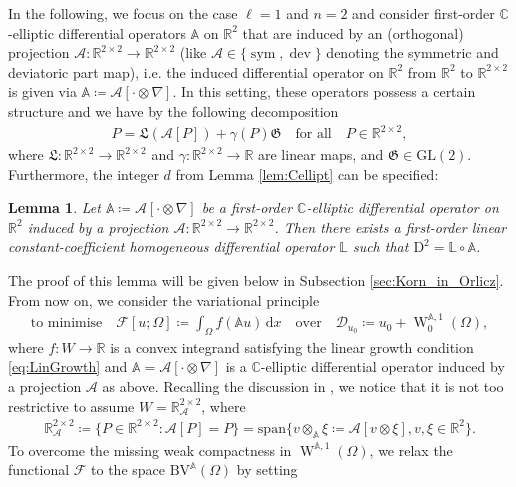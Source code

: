 \documentclass[a4paper,10pt,reqno,oneside]{amsart}
\numberwithin{equation}{section}
\newcommand{\R}{\mathbb R}
\newcommand{\C}{\mathbb C}
\newcommand{\A}{\mathscr{A}}
\newcommand{\Aop}{\mathbb{A}}
\newcommand{\sobo}{\operatorname{W}}
\newcommand{\BV}{\mathrm{BV}}
\newcommand{\D}{\mathrm{D}}
\newcommand{\dev}{\operatorname{dev}}
\newcommand{\sym}{\operatorname{sym}}
\newcommand{\dx}[1]{\,\mathrm{d}#1}
\newcommand{\F}{\mathscr{F}}
\newtheorem{lem}[thm]{Lemma}
\begin{document}
In the following, we focus on the case $\ell=1$ and $n=2$ and consider first-order $\C$-elliptic differential operators $\Aop$ on $\R^2$ that are induced by an (orthogonal) projection $\A\colon\R^{2\times 2}\to\R^{2\times2}$ (like $\A\in\{\sym,\dev\}$ denoting the symmetric and deviatoric part map), i.e. the induced differential operator on $\R^2$ from $\R^2$ to $\R^{2\times2}$ is given via $\Aop\coloneqq \A[\cdot\otimes \nabla]$. In this setting, these operators possess a certain structure and we have by \cite[Prop 4.1]{GLN1} the following decomposition
\begin{align}\label{eq:complementarypart}
	P = \mathfrak{L}(\A[P]) + \gamma(P) \mathfrak{G}\quad\mbox{for all}\quad P\in\R^{2\times 2}, 
\end{align}
where $\mathfrak{L}\colon\R^{2\times 2}\to \R^{2\times 2}$ and $\gamma\colon\R^{2\times2}\to \R$ are linear maps, and $\mathfrak{G}\in\mathrm{GL}(2)$. Furthermore, the integer $d$ from Lemma \ref{lem:Cellipt} can be specified:
\begin{lem}\label{lem:Cellipt2d}
	Let $\Aop\coloneqq\A[\cdot\otimes\nabla]$ be a first-order $\C$-elliptic differential operator on $\R^2$ induced by a projection $\A:\R^{2\times2}\to\R^{2\times2}$. Then there exists a first-order linear constant-coefficient homogeneous differential operator $\mathbb{L}$ such that $\D^2=\mathbb{L}\circ\Aop$.
\end{lem}
The proof of this lemma will be given below in Subsection \ref{sec:Korn_in_Orlicz}. From now on, we consider the variational principle
\begin{align*}
	\mbox{to minimise}\quad \mathscr{F}[u;\Omega ]\coloneqq \int_\Omega f(\Aop u) \dx{x} \quad\mbox{over} \quad \mathscr{D}_{u_0} \coloneqq u_0 + \sobo^{\Aop,1}_0(\Omega),
\end{align*}
where $f\colon W\to \R$ is a convex integrand satisfying the linear growth condition \eqref{eq:LinGrowth} and $\Aop=\A[\cdot\otimes\nabla]$ is a $\C$-elliptic differential operator induced by a projection $\A$ as above. Recalling the discussion in  \cite[Sec. 5]{BDG}, we notice that it is not too restrictive to assume $W=\R^{2\times 2}_\A$, where 
\begin{align*}
	\R^{2\times 2}_{\A}\coloneqq\{P\in\R^{2\times 2}:\A[P]=P\}=\mathrm{span}\{v\otimes_{\Aop} \xi\coloneqq \A[v\otimes \xi], v,\xi\in\R^2\}. 
\end{align*}
To overcome the missing weak compactness in $\sobo^{\Aop,1}(\Omega)$, we relax the functional $\F$ to the space $\BV^\Aop(\Omega)$ by setting
\end{document}
